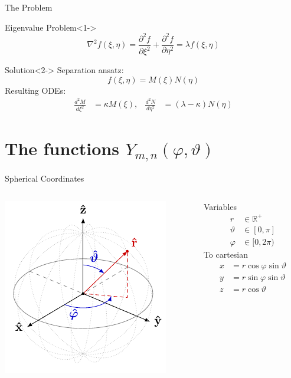 \documentclass[xetex, onlymath, aspectratio=169]{beamer}
\begin{document}
\begin{frame}{The Problem}
	\begin{block}{Eigenvalue Problem}<1->
		\[
			\nabla^2 f(\xi, \eta)
			  = \frac{\partial^2 f}{\partial \xi^2} + \frac{\partial^2 f}{\partial \eta^2}
			  = \lambda f(\xi, \eta)
		\]
	\end{block}
	\begin{alertblock}{Solution}<2->
		Separation ansatz:
		\[
			f(\xi, \eta) = M(\xi) N(\eta)
		\]
		Resulting ODEs:
		\begin{align*}
			\frac{d^2 M}{d \xi^2} &= \kappa M(\xi), & \frac{d^2 N}{d \eta^2} &= (\lambda - \kappa) N(\eta)
		\end{align*}
	\end{alertblock}
\end{frame}

\section{The functions \(Y_{m, n}(\varphi, \vartheta)\)}

\begin{frame}{Spherical Coordinates}
	\begin{columns}
		\begin{column}{.6\linewidth}
			\includegraphics[height=.9\paperheight]{figures/spherical-coordinates}
		\end{column}
		\begin{column}{.4\linewidth}
			\noindent
			Variables
			\begin{align*}
				r &\in \mathbb{R}^+ \\
				\vartheta &\in [0, \pi] \\
				\varphi &\in [0, 2\pi)
			\end{align*}
			To cartesian
			\begin{align*}
				x &= r\cos\varphi \sin\vartheta \\
				y &= r\sin\varphi\sin\vartheta \\
				z &= r\cos\vartheta
			\end{align*}
		\end{column}
	\end{columns}
\end{frame}
\end{document}
